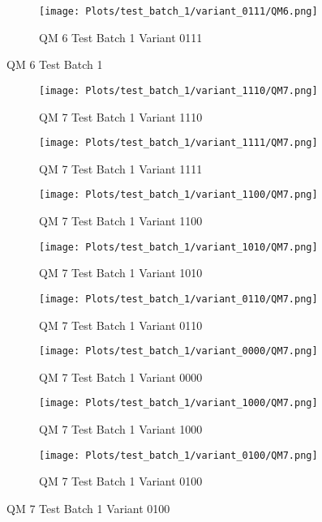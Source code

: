 \documentclass{DissertateFigs}
\begin{document}
\begin{figure}[t!]
\medskip

    \begin{subfigure}{0.47\textwidth}
    \texttt{[image: Plots/test\_batch\_1/variant\_0111/QM6.png]}
    \caption{QM 6 Test Batch 1 Variant 0111}
    \end{subfigure}
\caption{QM 6 Test Batch 1}
    \end{figure}
\clearpage
\begin{figure}[t!]
    \begin{subfigure}{0.47\textwidth}
    \texttt{[image: Plots/test\_batch\_1/variant\_1110/QM7.png]}
    \caption{QM 7 Test Batch 1 Variant 1110}
    \end{subfigure}
    \begin{subfigure}{0.47\textwidth}
    \texttt{[image: Plots/test\_batch\_1/variant\_1111/QM7.png]}
    \caption{QM 7 Test Batch 1 Variant 1111}
    \end{subfigure}

\medskip

    \begin{subfigure}{0.47\textwidth}
    \texttt{[image: Plots/test\_batch\_1/variant\_1100/QM7.png]}
    \caption{QM 7 Test Batch 1 Variant 1100}
    \end{subfigure}
    \begin{subfigure}{0.47\textwidth}
    \texttt{[image: Plots/test\_batch\_1/variant\_1010/QM7.png]}
    \caption{QM 7 Test Batch 1 Variant 1010}
    \end{subfigure}

\medskip

    \begin{subfigure}{0.47\textwidth}
    \texttt{[image: Plots/test\_batch\_1/variant\_0110/QM7.png]}
    \caption{QM 7 Test Batch 1 Variant 0110}
    \end{subfigure}
    \begin{subfigure}{0.47\textwidth}
    \texttt{[image: Plots/test\_batch\_1/variant\_0000/QM7.png]}
    \caption{QM 7 Test Batch 1 Variant 0000}
    \end{subfigure}

\medskip

    \begin{subfigure}{0.47\textwidth}
    \texttt{[image: Plots/test\_batch\_1/variant\_1000/QM7.png]}
    \caption{QM 7 Test Batch 1 Variant 1000}
    \end{subfigure}
    \begin{subfigure}{0.47\textwidth}
    \texttt{[image: Plots/test\_batch\_1/variant\_0100/QM7.png]}
    \caption{QM 7 Test Batch 1 Variant 0100}
    \end{subfigure}


\end{figure}
\end{document}
